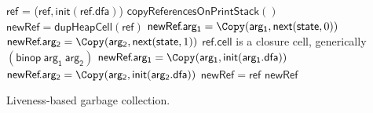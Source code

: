 \documentclass[9pt,preprint,letter,nonatbib]{sigplanconf}
\begin{document}
\begin{algorithm}[t!]
  \Pro{\Lgc{}}
     {
            {$\mathsf{ref}$ = \Copy($\mathsf{ref}, \mathsf{init}(\mathsf{ref.dfa})$)\;}
            ${\mathsf{copyReferencesOnPrintStack}()}$\;  
     }
        {
             {
               $\mathsf{newRef} = \mathsf{dupHeapCell}(\mathsf{ref})$\;
                  {
                    {
                      $\mathsf{newRef}\!.\mathsf{arg_1}  = \Copy(\mathsf{arg_1}, \mathsf{next}(\mathsf{state}, 0))$\;
                    }
                    {
                      $\mathsf{newRef}\!.\mathsf{arg_2} =  \Copy(\mathsf{arg_2},
                      \mathsf{next}(\mathsf{state} , 1))$\;
                    }    
                  }
               \If
                  {$\mathsf{ref\!.cell}$ is a
                    closure cell, generically  $\mathsf{(binop~arg_1~arg_2)}$}
                   { 
                     $\mathsf{newRef}\!.\mathsf{arg_1} = \Copy(\mathsf{arg_1}, \mathsf{init}(\mathsf{arg_1.dfa}))$\;
                     $\mathsf{newRef}\!.\mathsf{arg_2} = \Copy(\mathsf{arg_2}, \mathsf{init}(\mathsf{arg_2.dfa}))$\;
                   }
             }
             {$\mathsf{newRef = ref}$}
\KwRet $\mathsf{newRef}$\;
        }
        \caption{Liveness-based garbage collection.  \label{algo:lgc-a}}
\end{algorithm}



\newcommand{\hgt}{2.9cm}
\newcommand{\LGCLine}{blue}
\newcommand{\RGCLine}{red}
\newcommand{\ReachLine}{black}
\newcommand{\UseLine}{light-blue}
\end{document}
